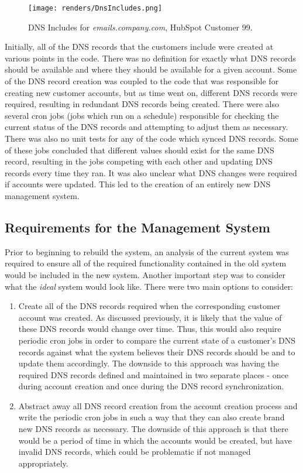 \begin{figure}[H]
      \centering
      \texttt{[image: renders/DnsIncludes.png]}
      \caption{DNS Includes for \textit{emails.company.com}, HubSpot Customer 99.}
      \label{fig:dnsIncludes}
\end{figure}

Initially, all of the DNS records that the customers include were created at various points in the code. There was no definition for exactly what DNS records should be available and where they should be available for a given account. Some of the DNS record creation was coupled to the code that was responsible for creating new customer accounts, but as time went on, different DNS records were required, resulting in redundant DNS records being created. There were also several cron jobs (jobs which run on a schedule) responsible for checking the current status of the DNS records and attempting to adjust them as necessary. There was also no unit tests for any of the code which synced DNS records. Some of these jobs concluded that different values should exist for the same DNS record, resulting in the jobs competing with each other and updating DNS records every time they ran. It was also unclear what DNS changes were required if accounts were updated. This led to the creation of an entirely new DNS management system.


\subsection{Requirements for the Management System}
Prior to beginning to rebuild the system, an analysis of the current system was required to ensure all of the required functionality contained in the old system would be included in the new system. Another important step was to consider what the \textit{ideal} system would look like. There were two main options to consider:

\begin{enumerate}
    \item{Create all of the DNS records required when the corresponding customer account was created. As discussed previously, it is likely that the value of these DNS records would change over time. Thus, this would also require periodic cron jobs in order to compare the current state of a customer's DNS records against what the system believes their DNS records should be and to update them accordingly. The downside to this approach was having the required DNS records defined and maintained in two separate places - once during account creation and once during the DNS record synchronization.}
    \item{Abstract away all DNS record creation from the account creation process and write the periodic cron jobs in such a way that they can also create brand new DNS records as necessary. The downside of this approach is that there would be a period of time in which the accounts would be created, but have invalid DNS records, which could be problematic if not managed appropriately.}  
\end{enumerate}


